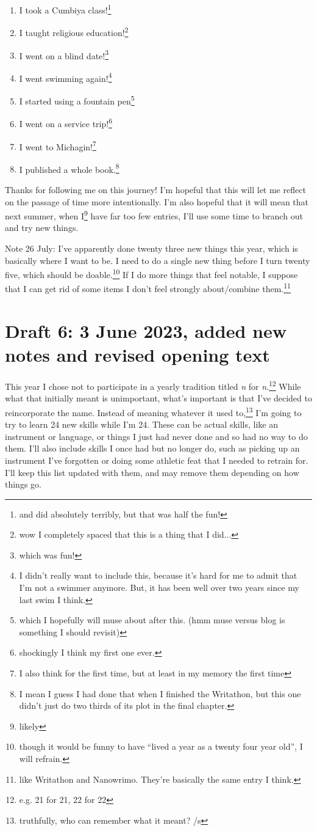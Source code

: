 \documentclass[12pt]{article}[titlepage]
\newcommand{\say}[1]{``#1''}
\newcommand{\1}{\={a}}
\newcommand{\2}{\={e}}
\newcommand{\3}{\={\i}}
\newcommand{\4}{\=o}
\newcommand{\5}{\=u}
\newcommand{\6}{\={A}}
\renewcommand{\,}{\textsuperscript{,}}
\begin{document}
\begin{enumerate}
\item I took a Cumbiya class!\footnote{and did absolutely terribly, but that was half the fun!}
\item I taught religious education!\footnote{wow I completely spaced that this is a thing that I did...}
\item I went on a blind date!\footnote{which was fun!}
\item I went swimming again!\footnote{I didn't really want to include this, because it's hard for me to admit that I'm not a swimmer anymore. But, it has been well over two years since my last swim I think.}
\item I started using a fountain pen\footnote{which I hopefully will muse about after this. (hmm muse versus blog is something I should revisit)}
\item I went on a service trip!\footnote{shockingly I think my first one ever.}
\item I went to Michagin!\footnote{I also think for the first time, but at least in my memory the first time}
\item I published a whole book.\footnote{I mean I guess I had done that when I finished the Writathon, but this one didn't just do two thirds of its plot in the final chapter.}
\end{enumerate}

Thanks for following me on this journey!
I'm hopeful that this will let me reflect on the passage of time more intentionally.
I'm also hopeful that it will mean that next summer, when I\footnote{likely} have far too few entries, I'll use some time to branch out and try new things.

Note 26 July: 
I've apparently done twenty three new things this year, which is basically where I want to be.
I need to do a single new thing before I turn twenty five, which should be doable.\footnote{though it would be funny to have \say{lived a year as a twenty four year old}, I will refrain.}
If I do more things that feel notable, I suppose that I can get rid of some items I don't feel strongly about/combine them.\footnote{like Writathon and Nanowrimo. They're basically the same entry I think.}


\section{Draft 6: 3 June 2023, added new notes and revised opening text}
This year I chose not to participate in a yearly tradition titled \textit{n} for \textit{n}.\footnote{e.g. 21 for 21, 22 for 22}
While what that initially meant is unimportant, what's important is that I've decided to reincorporate the name.
Instead of meaning whatever it used to,\footnote{truthfully, who can remember what it meant? /s} I'm going to try to learn 24 new skills while I'm 24.
These can be actual skills, like an instrument or language, or things I just had never done and so had no way to do them.
I'll also include skills I once had but no longer do, such as picking up an instrument I've forgotten or doing some athletic feat that I needed to retrain for.
I'll keep this list updated with them, and may remove them depending on how things go.
\end{document}
